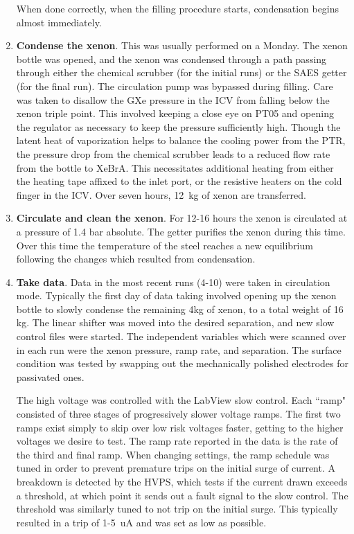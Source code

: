 \begin{enumerate}
    When done correctly, when the filling procedure starts, condensation begins almost immediately.
    \item \textbf{Condense the xenon}.
    This was usually performed on a Monday. 
    The xenon bottle was opened, and the xenon was condensed through a path passing through either the chemical scrubber (for the initial runs) or the SAES getter (for the final run).
    The circulation pump was bypassed during filling.
    Care was taken to disallow the GXe pressure in the ICV from falling below the xenon triple point.
    This involved keeping a close eye on PT05 and opening the regulator as necessary to keep the pressure sufficiently high.
    Though the latent heat of vaporization helps to balance the cooling power from the PTR, the pressure drop from the chemical scrubber leads to a reduced flow rate from the bottle to XeBrA.
    This necessitates additional heating from either the heating tape affixed to the inlet port, or the resistive heaters on the cold finger in the ICV.
    Over seven hours, 12~kg of xenon are transferred.
    \item \textbf{Circulate and clean the xenon}.
    For 12-16 hours the xenon is circulated at a pressure of 1.4 bar absolute.
    The getter purifies the xenon during this time.
    Over this time the temperature of the steel reaches a new equilibrium following the changes which resulted from condensation.
    \item \textbf{Take data}.  Data in the most recent runs (4-10) were taken in circulation mode. Typically the first day of data taking involved opening up the xenon bottle to slowly condense the remaining 4kg of xenon, to a total weight of 16 kg.
    The linear shifter was moved into the desired separation, and new slow control files were started.
   The independent variables which were scanned over in each run were the xenon pressure, ramp rate, and separation.
   The surface condition was tested by swapping out the mechanically polished electrodes for passivated ones.
   
    The high voltage was controlled with the LabView slow control.
    Each ``ramp" consisted of three stages of progressively slower voltage ramps.
    The first two ramps exist simply to skip over low risk voltages faster, getting to the higher voltages we desire to test.
    The ramp rate reported in the data is the rate of the third and final ramp.
    When changing settings, the ramp schedule was tuned in order to prevent premature  trips on the initial surge of current.
    A breakdown is detected by the HVPS, which tests if the current drawn exceeds a threshold, at which point it sends out a fault signal to the slow control.
    The threshold was similarly tuned to not trip on the initial surge. 
    This typically resulted in a trip of 1-5~uA and was set as low as possible.
    

\end{enumerate}
